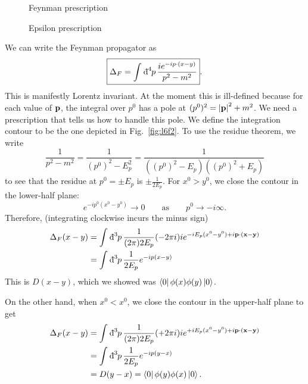 \begin{figure}[tbhp]
  \centering
  \begin{minipage}[t]{0.5\columnwidth}
    \centering
    \def\svgwidth{0.8\columnwidth}
    
    \caption{Feynman prescription}
    \label{fig:l6f2}
  \end{minipage}%
  \begin{minipage}[t]{0.5\columnwidth}
    \centering
    \def\svgwidth{0.8\columnwidth}
    
    \caption{Epsilon prescription}
    \label{fig:l6f3}
  \end{minipage}
\end{figure}

\begin{claim}
  We can write the Feynman propagator as
  \begin{equation}
    \boxed{\Delta_F = \int_{}^{} \bdd[4]{p} \frac{ie^{-ip \cdot (x - y)}}{p^2 - m^2}}.
  \end{equation}
  This is manifestly Lorentz invariant.
  At the moment this is ill-defined because for each value of $\vb{p}$, the integral over $p^0$ has a pole at $(p^0)^2 = \abs{\vb{p}}^2 + m^2$. 
  We need a prescription that tells us how to handle this pole. We define the integration contour to be the one depicted in Fig.~\ref{fig:l6f2}.
  To use the residue theorem, we write
  \begin{equation}
    \frac{1}{p^2 - m^2} = \frac{1}{(p^0)^2 - E_p^2} = \frac{1}{((p^0)^2 - E_p)((p^0)^2 + E_p)}
  \end{equation}
  to see that the residue at $p^0 = \pm E_p$ is $\pm \frac{1}{2 E_p}$.
  For $x^0 > y^0$, we close the contour in the lower-half plane:
  \begin{equation}
    e^{-i p^0 (x^0 - y^0)} \to 0 \qquad \text{as} \qquad p^0 \to -i \infty.
  \end{equation}
  Therefore, (integrating clockwise incurs the minus sign)
\begin{align}
  \Delta_F(x - y) &= \int_{}^{} \bdd[3]{p} \frac{1}{(2\pi) 2 E_p} (- 2\pi i) i e^{-i E_p (x^0 - y^0) + i \vb{p} \cdot (\vb{x} - \vb{y} )} \\
		  &= \int_{}^{} \bdd[3]{p} \frac{1}{2E_p} e^{-i p (x - y)}
  \end{align}
    This is $D(x - y)$, which we showed was $\bra{0} \phi(x) \phi(y) \ket{0}$.

    On the other hand, when $x^0 < x^0$, we close the contour in the upper-half plane to get 
  \begin{align}
    \Delta_F(x - y) &= \int_{}^{} \bdd[3]{p} \frac{1}{(2\pi) 2 E_p} (+ 2\pi i) i e^{+i E_p (x^0 - y^0) + i \vb{p} \cdot (\vb{x} - \vb{y} )} \\
		    &= \int_{}^{} \bdd[3]{p} \frac{1}{2E_p} e^{-i p (y - x)} \\
		    &= D(y - x) = \bra{0} \phi(y) \phi(x) \ket{0}.
  \end{align}
\end{claim}
